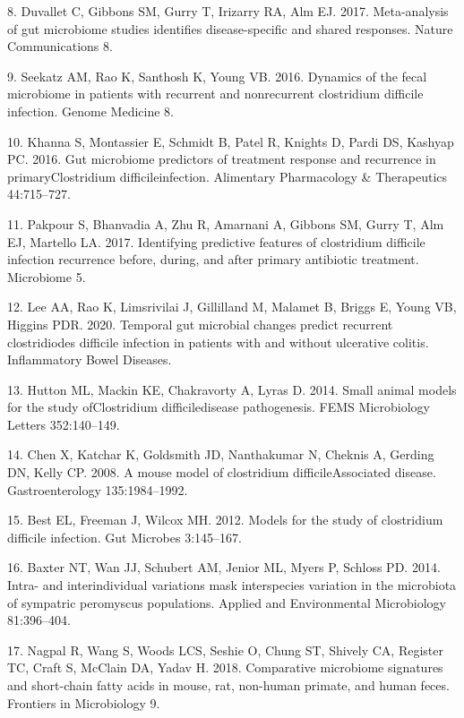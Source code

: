 \documentclass[11pt,]{article}
\begin{document}
\hypertarget{ref-Duvallet2017}{}
8. Duvallet C, Gibbons SM, Gurry T, Irizarry RA, Alm EJ. 2017.
Meta-analysis of gut microbiome studies identifies disease-specific and
shared responses. Nature Communications 8.

\hypertarget{ref-Seekatz2016}{}
9. Seekatz AM, Rao K, Santhosh K, Young VB. 2016. Dynamics of the fecal
microbiome in patients with recurrent and nonrecurrent clostridium
difficile infection. Genome Medicine 8.

\hypertarget{ref-Khanna2016}{}
10. Khanna S, Montassier E, Schmidt B, Patel R, Knights D, Pardi DS,
Kashyap PC. 2016. Gut microbiome predictors of treatment response and
recurrence in primaryClostridium difficileinfection. Alimentary
Pharmacology \& Therapeutics 44:715--727.

\hypertarget{ref-Pakpour2017}{}
11. Pakpour S, Bhanvadia A, Zhu R, Amarnani A, Gibbons SM, Gurry T, Alm
EJ, Martello LA. 2017. Identifying predictive features of clostridium
difficile infection recurrence before, during, and after primary
antibiotic treatment. Microbiome 5.

\hypertarget{ref-Lee2020}{}
12. Lee AA, Rao K, Limsrivilai J, Gillilland M, Malamet B, Briggs E,
Young VB, Higgins PDR. 2020. Temporal gut microbial changes predict
recurrent clostridiodes difficile infection in patients with and without
ulcerative colitis. Inflammatory Bowel Diseases.

\hypertarget{ref-Hutton2014}{}
13. Hutton ML, Mackin KE, Chakravorty A, Lyras D. 2014. Small animal
models for the study ofClostridium difficiledisease pathogenesis. FEMS
Microbiology Letters 352:140--149.

\hypertarget{ref-Chen2008}{}
14. Chen X, Katchar K, Goldsmith JD, Nanthakumar N, Cheknis A, Gerding
DN, Kelly CP. 2008. A mouse model of clostridium difficileAssociated
disease. Gastroenterology 135:1984--1992.

\hypertarget{ref-Best2012}{}
15. Best EL, Freeman J, Wilcox MH. 2012. Models for the study of
clostridium difficile infection. Gut Microbes 3:145--167.

\hypertarget{ref-Baxter2014}{}
16. Baxter NT, Wan JJ, Schubert AM, Jenior ML, Myers P, Schloss PD.
2014. Intra- and interindividual variations mask interspecies variation
in the microbiota of sympatric peromyscus populations. Applied and
Environmental Microbiology 81:396--404.

\hypertarget{ref-Nagpal2018}{}
17. Nagpal R, Wang S, Woods LCS, Seshie O, Chung ST, Shively CA,
Register TC, Craft S, McClain DA, Yadav H. 2018. Comparative microbiome
signatures and short-chain fatty acids in mouse, rat, non-human primate,
and human feces. Frontiers in Microbiology 9.
\end{document}

